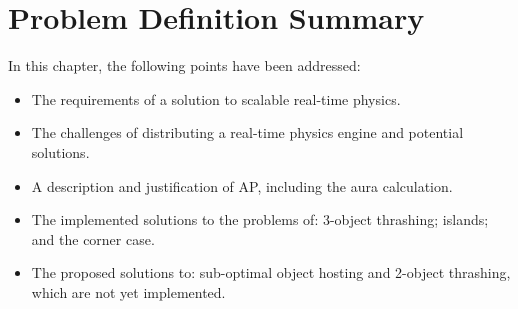 \section{Problem Definition Summary}
In this chapter, the following points have been addressed:
\begin{itemize}
	\item The requirements of a solution to scalable real-time physics.
	\item The challenges of distributing a real-time physics engine and potential solutions.
	\item A description and justification of AP, including the aura calculation.
	\item The implemented solutions to the problems of: 3-object thrashing; islands; and the corner case.
	\item The proposed solutions to: sub-optimal object hosting and 2-object thrashing, which are not yet implemented.
\end{itemize}
